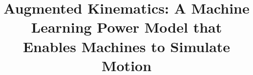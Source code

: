 \documentclass[conference]{IEEEtran}
\begin{document}
\title{Augmented Kinematics: A Machine Learning Power Model that Enables Machines to Simulate Motion}


\end{document}

